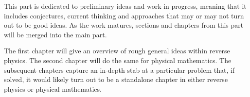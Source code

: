This part is dedicated to preliminary ideas and work in progress, meaning that it includes conjectures, current thinking and approaches that may or may not turn out to be good ideas. As the work matures, sections and chapters from this part will be merged into the main part.

The first chapter will give an overview of rough general ideas within reverse physics. The second chapter will do the same for physical mathematics. The subsequent chapters capture an in-depth stab at a particular problem that, if solved, it would likely turn out to be a standalone chapter in either reverse physics or physical mathematics.
